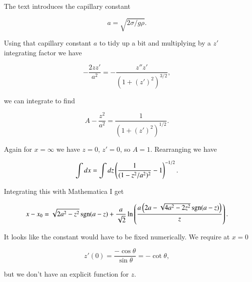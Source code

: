 {The text introduces the capillary constant

\begin{equation}\label{eqn:continuumFluidsReview:1730}
a = \sqrt{2 \sigma/ g \rho}.
\end{equation}

Using that capillary constant $a$ to tidy up a bit and multiplying by a $z'$ integrating factor we have

\begin{equation}\label{eqn:continuumFluidsReview:1750}
-\frac{2 z z'}{a^2} = -\frac{z'' z'}{(1 + (z')^2)^{3/2}},
\end{equation}

we can integrate to find

\begin{equation}\label{eqn:continuumFluidsReview:1770}
A - \frac{z^2}{a^2} = \frac{1}{(1 + (z')^2)^{1/2}}.
\end{equation}

Again for $x = \infty$ we have $z = 0$, $z' = 0$, so $A = 1$.  Rearranging we have

\begin{equation}\label{eqn:continuumFluidsReview:1790}
\int dx = \int dz \left( \frac{1}{(1 - z^2/a^2)^2} - 1 \right)^{-1/2}.
\end{equation}

Integrating this with Mathematica I get

\begin{equation}\label{eqn:continuumFluidsReview:1810}
x - x_0 =
\sqrt{2 a^2-z^2} \operatorname{sgn}(a-z)+ \frac{a}{\sqrt{2}} \ln \left(\frac{a \left(2 a-\sqrt{4 a^2-2 z^2} \operatorname{sgn}(a-z)\right)}{z}\right).
\end{equation}

It looks like the constant would have to be fixed numerically.  We require at $x = 0$

\begin{equation}\label{eqn:continuumFluidsReview:1830}
z'(0) = \frac{-\cos\theta}{\sin\theta} = -\cot \theta,
\end{equation}

but we don't have an explicit function for $z$.
} %


